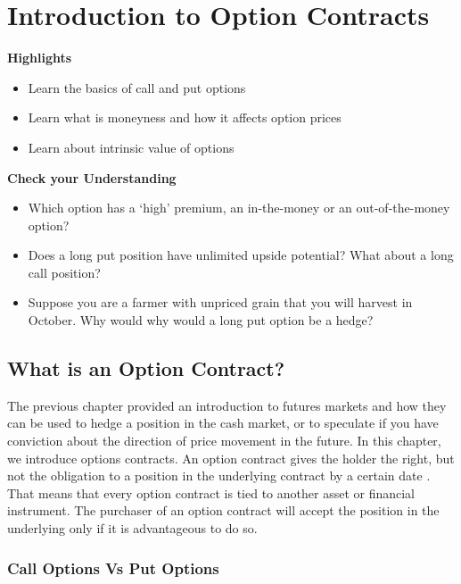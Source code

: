 \documentclass[
]{book}
\begin{document}
\hypertarget{introduction-to-option-contracts}{%
\chapter{Introduction to Option Contracts}\label{introduction-to-option-contracts}}

\textbf{Highlights}

\begin{itemize}
\item
  Learn the basics of call and put options
\item
  Learn what is moneyness and how it affects option prices
\item
  Learn about intrinsic value of options
\end{itemize}

\textbf{Check your Understanding}

\begin{itemize}
\item
  Which option has a `high' premium, an in-the-money or an out-of-the-money option?
\item
  Does a long put position have unlimited upside potential? What about a long call position?
\item
  Suppose you are a farmer with unpriced grain that you will harvest in October. Why would why would a long put option be a hedge?
\end{itemize}

\hypertarget{what-is-an-option-contract}{%
\section{What is an Option Contract?}\label{what-is-an-option-contract}}

The previous chapter provided an introduction to futures markets and how they can be used to hedge a position in the cash market, or to speculate if you have conviction about the direction of price movement in the future. In this chapter, we introduce options contracts. An option contract gives the holder the right, but not the obligation to a position in the underlying contract by a certain date \citep{hull2017}. That means that every option contract is tied to another asset or financial instrument. The purchaser of an option contract will accept the position in the underlying only if it is advantageous to do so.

\hypertarget{call-options-vs-put-options}{%
\subsection{Call Options Vs Put Options}\label{call-options-vs-put-options}}
\end{document}
